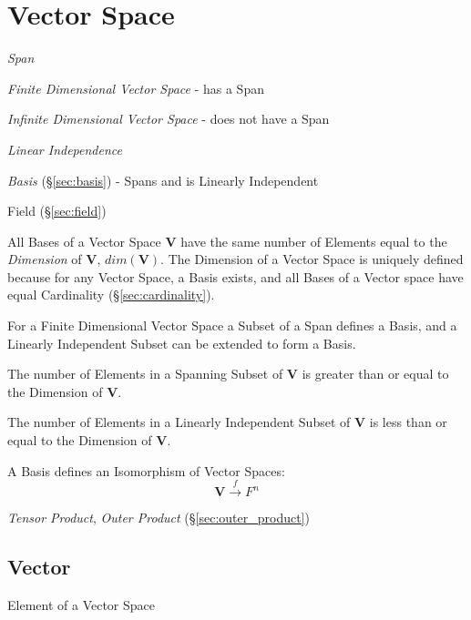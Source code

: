 \section{Vector Space}\label{sec:vector_space}

\emph{Span}

\emph{Finite Dimensional Vector Space} - has a Span

\emph{Infinite Dimensional Vector Space} - does not have a Span

\emph{Linear Independence}

\emph{Basis} (\S\ref{sec:basis}) - Spans and is Linearly Independent

Field (\S\ref{sec:field})

All Bases of a Vector Space $\mathbf{V}$ have the same number of
Elements equal to the \emph{Dimension} of $\mathbf{V}$,
$dim(\mathbf{V})$. The Dimension of a Vector Space is uniquely defined
because for any Vector Space, a Basis exists, and all Bases of a
Vector space have equal Cardinality (\S\ref{sec:cardinality}).

For a Finite Dimensional Vector Space a Subset of a Span defines a
Basis, and a Linearly Independent Subset can be extended to form a
Basis.

The number of Elements in a Spanning Subset of $\mathbf{V}$ is greater
than or equal to the Dimension of $\mathbf{V}$.

The number of Elements in a Linearly Independent Subset of
$\mathbf{V}$ is less than or equal to the Dimension of $\mathbf{V}$.

A Basis defines an Isomorphism of Vector Spaces:
\[
    \mathbf{V} \xrightarrow{f} F^n
\]

\emph{Tensor Product}, \emph{Outer Product} (\S\ref{sec:outer_product})



\subsection{Vector}\label{sec:vector}

Element of a Vector Space



